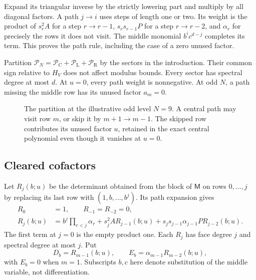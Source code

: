 \documentclass[11pt]{article}
\numberwithin{equation}{section}
\theoremstyle{remark}\newtheorem{remark}[theorem]{Remark}
\begin{document}
Expand its triangular inverse by the strictly lowering part and
multiply by all diagonal factors. A path \(j\to i\) uses steps of length
one or two. Its weight is the product of \(s_r^2A\) for a step
\(r\to r-1\), \(s_rs_{r-1}P\) for a step \(r\to r-2\), and
\(\alpha_r\) for precisely the rows it does not visit.
The middle monomial \(b^ic^{d-j}\) completes its term.
This proves the path rule, including the case of a zero unused factor.

Partition \(\mathcal P_N=\mathcal P_{\mathrm C}+\mathcal P_{\mathrm L}
+\mathcal P_{\mathrm R}\) by the sectors in the introduction.
Their common sign relative to \(H_V\) does not affect modulus bounds.
Every sector has spectral degree at most \(d\). At \(u=0\), every
path weight is nonnegative. At odd \(N\), a path missing the middle
row has its unused factor \(a_m=0\).

\begin{figure}[ht]
\centering
{}
\caption{The partition at the illustrative odd level \(N=9\).
A central path may visit row \(m\), or skip it by \(m+1\to m-1\).
The skipped row contributes its unused factor \(u\), retained in the
exact central polynomial even though it vanishes at \(u=0\).}
\label{lc:path-figure}
\end{figure}

\subsection{Cleared cofactors}
Let \(R_j(b;u)\) be the determinant obtained from the block of
\(\mathsf M\) on rows \(0,\ldots,j\) by replacing its last row with
\((1,b,\ldots,b^j)\). Its path expansion gives
\begin{equation}\label{lc:R-recurrence}
\begin{split}
 R_0&=1,\qquad R_{-1}=R_{-2}=0,\\
 R_j(b;u)&=b^j\prod_{r<j}\alpha_r+s_j^2A R_{j-1}(b;u)
                +s_js_{j-1}\alpha_{j-1}P R_{j-2}(b;u).
\end{split}
\end{equation}
The first term at \(j=0\) is the empty product one. Each \(R_j\)
has face degree \(j\) and spectral degree at most \(j\). Put
\[
 D_b=R_{m-1}(b;u),\qquad E_b=\alpha_{m-1}R_{m-2}(b;u),
\]
with \(E_b=0\) when \(m=1\). Subscripts \(b,c\) here denote substitution
of the middle variable, not differentiation.
\end{document}
